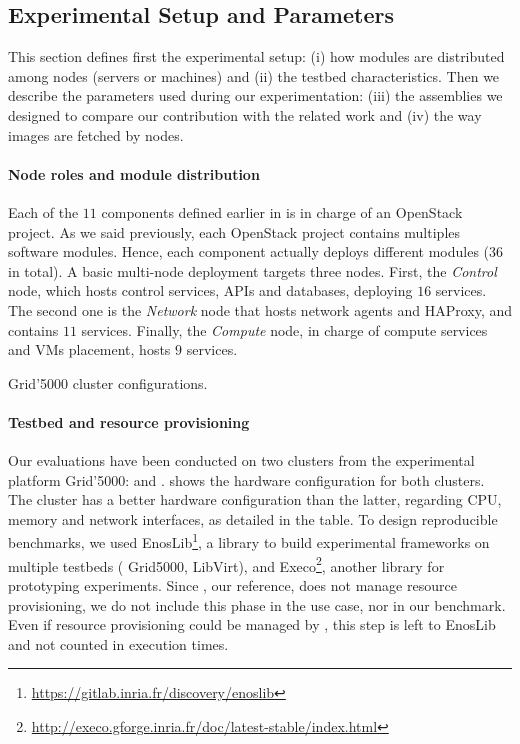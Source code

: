 \subsection{Experimental Setup and Parameters}

This section defines first the experimental setup: (i) how modules are
distributed among nodes (\ie servers or machines) and (ii) the testbed
characteristics. Then we describe the parameters used during
our experimentation: (iii) the assemblies we designed to compare our
contribution with the related work and (iv) the way \docker images are
fetched by nodes.

\paragraph{Node roles and module distribution}
Each of the $11$ components defined earlier in \kolla is in charge of
an OpenStack project. As we said previously, each OpenStack project
contains multiples software modules. Hence, each component actually
deploys different modules ($36$ in total). A basic multi-node \kolla
deployment targets three nodes. First, the \emph{Control} node, which
hosts control services, APIs and databases, deploying $16$
services. The second one is the \emph{Network} node that hosts network
agents and HAProxy, and contains $11$ services. Finally, the
\emph{Compute} node, in charge of compute services and VMs placement,
hosts $9$ services.

\begin{table}
  \begin{center}
    \small
    
    \caption{Grid'5000 cluster configurations.}
    \label{tab:g5k}
  \end{center}
\end{table}

\paragraph{Testbed and resource provisioning}
Our evaluations have been conducted on two clusters from the
experimental platform Grid'5000: \ecotype and \nova. 
shows the hardware configuration for both clusters. The cluster
\ecotype has a better hardware configuration than the latter,
regarding CPU, memory and network interfaces, as detailed in the
table. To design reproducible benchmarks, we used
EnosLib\footnote{\url{https://gitlab.inria.fr/discovery/enoslib}}, a
library to build experimental frameworks on multiple testbeds (\eg
Grid5000, LibVirt), and
Execo\footnote{\url{http://execo.gforge.inria.fr/doc/latest-stable/index.html}},
another library for prototyping experiments. Since \kolla, our
reference, does not manage resource provisioning, we do not include
this phase in the use case, nor in our benchmark. Even if resource
provisioning could be managed by \mad, this step is left to EnosLib
and not counted in execution times.

